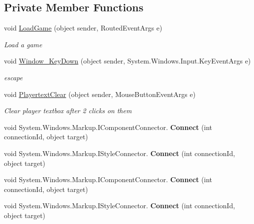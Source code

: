 \subsection*{Private Member Functions}
\begin{DoxyCompactItemize}
\item 
void \mbox{\hyperlink{class_bomberman_1_1_u_i_1_1_level_select_window_a569fa61bad08888dd02ef4431dfe4c91}{Load\+Game}} (object sender, Routed\+Event\+Args e)
\begin{DoxyCompactList}\small\item\em Load a game \end{DoxyCompactList}\item 
void \mbox{\hyperlink{class_bomberman_1_1_u_i_1_1_level_select_window_ab8aee8635d86096021e5e3d915566f6c}{Window\+\_\+\+Key\+Down}} (object sender, System.\+Windows.\+Input.\+Key\+Event\+Args e)
\begin{DoxyCompactList}\small\item\em escape \end{DoxyCompactList}\item 
void \mbox{\hyperlink{class_bomberman_1_1_u_i_1_1_level_select_window_a530ef79ebf0a74574b546faac3a2d20d}{Playertext\+Clear}} (object sender, Mouse\+Button\+Event\+Args e)
\begin{DoxyCompactList}\small\item\em Clear player textbox after 2 clicks on them \end{DoxyCompactList}\item 
\mbox{\label{class_bomberman_1_1_u_i_1_1_level_select_window_ab1defe3e2a8879fb0a7a9d2f303fb667}} 
void System.\+Windows.\+Markup.\+I\+Component\+Connector. {\bfseries Connect} (int connection\+Id, object target)
\item 
\mbox{\label{class_bomberman_1_1_u_i_1_1_level_select_window_aec44474acaf39e52957f8498f3219929}} 
void System.\+Windows.\+Markup.\+I\+Style\+Connector. {\bfseries Connect} (int connection\+Id, object target)
\item 
\mbox{\label{class_bomberman_1_1_u_i_1_1_level_select_window_ab1defe3e2a8879fb0a7a9d2f303fb667}} 
void System.\+Windows.\+Markup.\+I\+Component\+Connector. {\bfseries Connect} (int connection\+Id, object target)
\item 
\mbox{\label{class_bomberman_1_1_u_i_1_1_level_select_window_aec44474acaf39e52957f8498f3219929}} 
void System.\+Windows.\+Markup.\+I\+Style\+Connector. {\bfseries Connect} (int connection\+Id, object target)
\end{DoxyCompactItemize}
